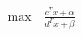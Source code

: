 \documentclass[preview]{standalone}
\begin{document}
\begin{align*}
\text{max}\quad \frac{c^Tx+\alpha}{d^Tx+\beta}
\end{align*}
\end{document}
